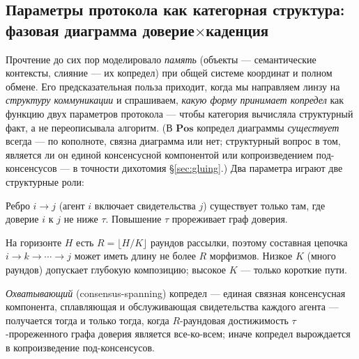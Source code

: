 \documentclass{article}
\begin{document}
\subsection{Параметры протокола как категорная структура: фазовая диаграмма доверие\texorpdfstring{$\times$}{x}каденция}
\label{sec:phase-diagram}

Прочтение до сих пор моделировало \emph{память} (объекты --- семантические
контексты, слияние --- их копредел) при общей системе координат и полном
обмене. Его предсказательная польза приходит, когда мы направляем линзу на
\emph{структуру коммуникации} и спрашиваем, \emph{какую форму принимает
копредел} как функцию двух параметров протокола --- чтобы категория вычисляла
структурный факт, а не переописывала алгоритм. (В $\mathbf{Pos}$ копредел
диаграммы \emph{существует} всегда --- по кополноте, связна диаграмма или
нет; структурный вопрос в том, является ли он единой консенсусной
компонентой или копроизведением под-консенсусов --- в точности дихотомия
\S\ref{sec:gluing}.) Два параметра играют две
структурные роли:
\begin{description}[leftmargin=12pt,topsep=2pt,itemsep=1pt]
\item[Доверие $\tau$ управляет морфизмами.] Ребро $i\!\to\!j$ (агент $i$
включает свидетельства $j$) существует только там, где доверие $i$ к $j$ не
ниже $\tau$. Повышение $\tau$ прореживает граф доверия.
\item[Каденция $K$ управляет глубиной композиции.] На горизонте $H$ есть
$R=\lfloor H/K\rfloor$ раундов рассылки, поэтому составная цепочка
$i\!\to\!k\!\to\!\cdots\!\to\!j$ может иметь длину не более $R$ морфизмов.
Низкое $K$ (много раундов) допускает глубокую композицию; высокое $K$ ---
только короткие пути.
\end{description}
\emph{Охватывающий} (consensus-spanning) копредел --- единая связная
консенсусная компонента, сплавляющая и обслуживающая свидетельства каждого
агента --- получается тогда и только тогда, когда $R$-раундовая достижимость
$\tau$-прореженного графа доверия является все-ко-всем; иначе копредел
вырождается в копроизведение под-консенсусов.
\end{document}
